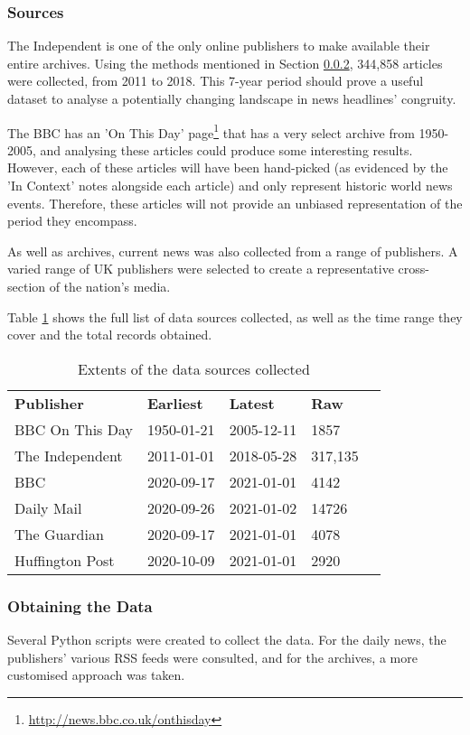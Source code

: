\subsubsection{Sources}
The Independent is one of the only online publishers to make available their entire archives. Using the methods mentioned in Section \ref{obtaining-data}, 344,858 articles were collected, from 2011 to 2018. This 7-year period should prove a useful dataset to analyse a potentially changing landscape in news headlines' congruity.

The BBC has an 'On This Day' page\footnote{\url{http://news.bbc.co.uk/onthisday}} that has a very select archive from 1950-2005, and analysing these articles could produce some interesting results. However, each of these articles will have been hand-picked (as evidenced by the 'In Context' notes alongside each article) and only represent historic world news events. Therefore, these articles will not provide an unbiased representation of the period they encompass.

As well as archives, current news was also collected from a range of publishers. A varied range of UK publishers were selected to create a representative cross-section of the nation's media.

Table \ref{tab:data-sources} shows the full list of data sources collected, as well as the time range they cover and the total records obtained.

\begin{table}[h]
\begin{tabular}{lllll}
\textbf{Publisher} & \textbf{Earliest} & \textbf{Latest} & \textbf{Raw} \\
BBC On This Day & 1950-01-21 & 2005-12-11 & 1857 \\
The Independent & 2011-01-01 & 2018-05-28 & 317,135  \\
BBC & 2020-09-17 & 2021-01-01 & 4142  \\
Daily Mail & 2020-09-26 & 2021-01-02 & 14726 \\
The Guardian & 2020-09-17 & 2021-01-01 & 4078 \\
Huffington Post & 2020-10-09 & 2021-01-01 & 2920 \\
\end{tabular}
\caption{Extents of the data sources collected}
\label{tab:data-sources}
\end{table}

\subsubsection{Obtaining the Data} \label{obtaining-data}
Several Python scripts were created to collect the data. For the daily news, the publishers' various RSS feeds were consulted, and for the archives, a more customised approach was taken.

